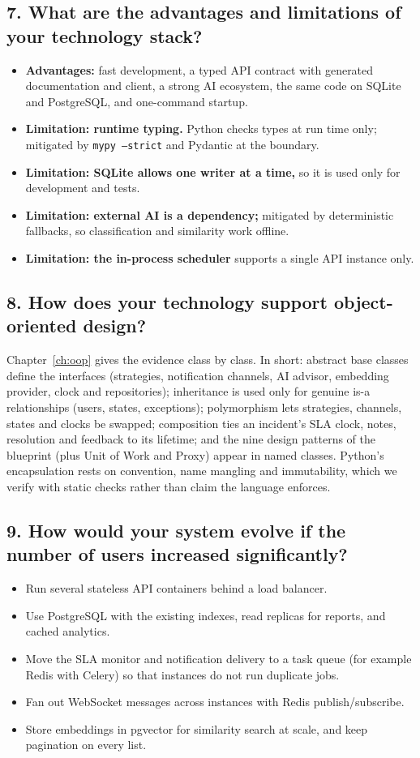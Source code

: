 \subsection*{7. What are the advantages and limitations of your technology stack?}
\begin{itemize}
  \item \textbf{Advantages:} fast development, a typed API contract with generated
    documentation and client, a strong AI ecosystem, the same code on SQLite and PostgreSQL,
    and one-command startup.
  \item \textbf{Limitation: runtime typing.} Python checks types at run time only; mitigated
    by \texttt{mypy --strict} and Pydantic at the boundary.
  \item \textbf{Limitation: SQLite allows one writer at a time,} so it is used only for
    development and tests.
  \item \textbf{Limitation: external AI is a dependency;} mitigated by deterministic
    fallbacks, so classification and similarity work offline.
  \item \textbf{Limitation: the in-process scheduler} supports a single API instance only.
\end{itemize}

\subsection*{8. How does your technology support object-oriented design?}
Chapter~\ref{ch:oop} gives the evidence class by class. In short: abstract base classes define
the interfaces (strategies, notification channels, AI advisor, embedding provider, clock and
repositories); inheritance is used only for genuine is-a relationships (users, states,
exceptions); polymorphism lets strategies, channels, states and clocks be swapped; composition
ties an incident's SLA clock, notes, resolution and feedback to its lifetime; and the nine
design patterns of the blueprint (plus Unit of Work and Proxy) appear in named classes. Python's encapsulation rests on convention, name mangling and
immutability, which we verify with static checks rather than claim the language enforces.

\subsection*{9. How would your system evolve if the number of users increased significantly?}
\begin{itemize}
  \item Run several stateless API containers behind a load balancer.
  \item Use PostgreSQL with the existing indexes, read replicas for reports, and cached
    analytics.
  \item Move the SLA monitor and notification delivery to a task queue (for example Redis with
    Celery) so that instances do not run duplicate jobs.
  \item Fan out WebSocket messages across instances with Redis publish/subscribe.
  \item Store embeddings in pgvector for similarity search at scale, and keep pagination on
    every list.
\end{itemize}
